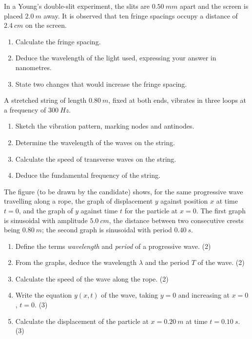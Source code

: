 \documentclass[11pt]{article}
\newcounter{popsec}
\newcounter{popsub}
\newcommand{\courssub}[1]{%
  \stepcounter{popsub}%
  \par\vspace{9pt}\noindent{\popxbold\fontsize{11.5}{13}\selectfont\color{popink}{\color{poporange}\thepopsec.\thepopsub}\hspace{6pt}#1}\par\nopagebreak\vspace{4pt}
}
\begin{document}
\begin{exercice}
In a Young's double-slit experiment, the slits are $\SI{0.50}{mm}$ apart and the screen is placed $\SI{2.0}{m}$ away. It is observed that ten fringe spacings occupy a distance of $\SI{2.4}{cm}$ on the screen.
\begin{enumerate}
\item Calculate the fringe spacing.
\item Deduce the wavelength of the light used, expressing your answer in nanometres.
\item State two changes that would increase the fringe spacing.
\end{enumerate}
\end{exercice}

\begin{exercice}
A stretched string of length $\SI{0.80}{m}$, fixed at both ends, vibrates in three loops at a frequency of $\SI{300}{Hz}$.
\begin{enumerate}
\item Sketch the vibration pattern, marking nodes and antinodes.
\item Determine the wavelength of the waves on the string.
\item Calculate the speed of transverse waves on the string.
\item Deduce the fundamental frequency of the string.
\end{enumerate}
\end{exercice}

\courssub{I prepare for the GCE}

\begin{exercice}
The figure (to be drawn by the candidate) shows, for the same progressive wave travelling along a rope, the graph of displacement $y$ against position $x$ at time $t = 0$, and the graph of $y$ against time $t$ for the particle at $x = 0$. The first graph is sinusoidal with amplitude $\SI{5.0}{cm}$, the distance between two consecutive crests being $\SI{0.80}{m}$; the second graph is sinusoidal with period $\SI{0.40}{s}$.
\begin{enumerate}
\item Define the terms \emph{wavelength} and \emph{period} of a progressive wave. \hfill (2)
\item From the graphs, deduce the wavelength $\lambda$ and the period $T$ of the wave. \hfill (2)
\item Calculate the speed of the wave along the rope. \hfill (2)
\item Write the equation $y(x,t)$ of the wave, taking $y = 0$ and increasing at $x = 0$, $t = 0$. \hfill (3)
\item Calculate the displacement of the particle at $x = \SI{0.20}{m}$ at time $t = \SI{0.10}{s}$. \hfill (3)
\end{enumerate}
\end{exercice}
\end{document}
